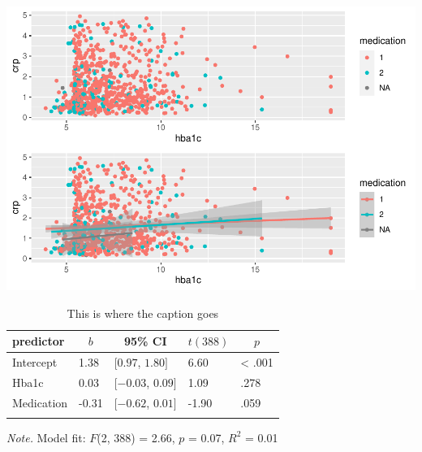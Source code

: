 \documentclass[
  man,floatsintext]{apa6}
\begin{document}
\includegraphics{Final_Groupof5_files/figure-latex/Reg1_HBA1C-CRP-1.pdf}

\begin{table}[tbp]

\begin{center}
\begin{threeparttable}

\caption{\label{tab:unnamed-chunk-5}This is where the caption goes}

\begin{tabular}{lllll}
\toprule
predictor & \multicolumn{1}{c}{$b$} & \multicolumn{1}{c}{95\% CI} & \multicolumn{1}{c}{$t(388)$} & \multicolumn{1}{c}{$p$}\\
\midrule
Intercept & 1.38 & $[0.97$, $1.80]$ & 6.60 & < .001\\
Hba1c & 0.03 & $[-0.03$, $0.09]$ & 1.09 & .278\\
Medication & -0.31 & $[-0.62$, $0.01]$ & -1.90 & .059\\
\bottomrule
\addlinespace
\end{tabular}

\begin{tablenotes}[para]
\normalsize{\textit{Note.} Model fit: $F$(2, 388) = 2.66, $p$ = 0.07, $R^2$ = 0.01}
\end{tablenotes}

\end{threeparttable}
\end{center}

\end{table}
\end{document}

